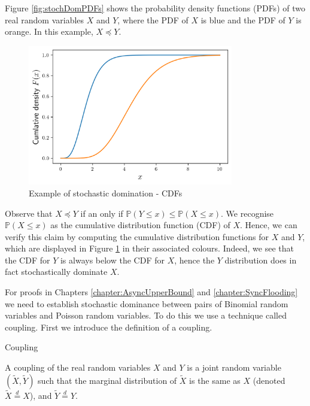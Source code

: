 Figure \ref{fig:stochDomPDFs} shows the probability density functions (PDFs) of two real random variables $X$ and $Y$, where the PDF of $X$ is blue and the PDF of $Y$ is orange. In this example, $X \preceq Y$.

\begin{figure}[h]
	\centering
	\includegraphics[width=0.8\textwidth]{./figures/stochastic_domination_cdf.png}
	\caption{Example of stochastic domination - CDFs}
	\label{fig:stochDomCDFs}
\end{figure}

Observe that $X \preceq Y$ if an only if $\mathbb{P}(Y \leq x) \leq \mathbb{P}(X \leq x)$. We recognise $\mathbb{P}(X \leq x)$ as the cumulative distribution function (CDF) of $X$. Hence, we can verify this claim by computing the cumulative  distribution functions for $X$ and $Y$, which are displayed in Figure \ref{fig:stochDomCDFs} in their associated colours. Indeed, we see that the CDF for $Y$ is always below the CDF for $X$, hence the $Y$ distribution does in fact stochastically dominate $X$.

For proofs in Chapters \ref{chapter:AsyncUpperBound} and \ref{chapter:SyncFlooding} we need to establish stochastic dominance between pairs of Binomial random variables and Poisson random variables. To do this we use a technique called coupling. First we introduce the definition of a coupling.

\begin{definition} %
	Coupling

	\noindent
	A coupling of the real random variables $X$ and $Y$ is a joint random variable $(\tilde{X}, \tilde{Y})$ such that the marginal distribution of $\tilde{X}$ is the same as $X$ (denoted $\tilde{X} \stackrel{d}{=} X$), and $\tilde{Y} \stackrel{d}{=} Y$.
\end{definition}

